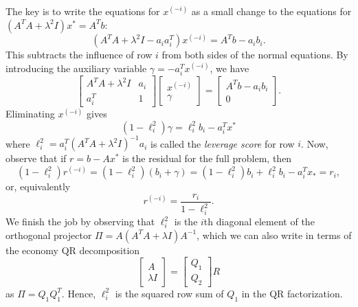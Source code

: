 \documentclass[12pt, leqno]{article} %
\begin{document}
The key is to write the equations for $x^{(-i)}$ as a small change to
the equations for $(A^T A + \lambda^2 I) x^* = A^T b$:
\[
  (A^T A + \lambda^2 I - a_i a_i^T) x^{(-i)} = A^T b - a_i b_i.
\]
This subtracts the influence of row $i$ from both sides of the normal
equations.  By introducing the auxiliary variable $\gamma = -a_i^T x^{(-i)}$,
we have
\[
  \begin{bmatrix}
    A^TA + \lambda^2 I & a_i \\
    a_i^T & 1
  \end{bmatrix}
  \begin{bmatrix} x^{(-i)} \\ \gamma \end{bmatrix} =
  \begin{bmatrix} A^T b - a_i b_i \\ 0 \end{bmatrix}.
\]
Eliminating $x^{(-i)}$ gives
\[
  (1-\ell_i^2) \gamma = \ell_i^2 b_i - a_i^T x^*
\]
where $\ell_i^2 = a_i^T (A^T A + \lambda^2 I)^{-1} a_i$ is called the
{\em leverage score} for row $i$.  Now, observe that
if $r = b-Ax^*$ is the residual for the full problem, then
\[
(1-\ell_i^2) r^{(-i)}
  = (1-\ell_i^2) (b_i + \gamma)
  = (1-\ell_i^2) b_i + \ell_i^2 b_i - a_i^T x_*
  = r_i,
\]
or, equivalently
\[
  r^{(-i)} = \frac{r_i}{1-\ell_i^2}.
\]
We finish the job by observing that $\ell_i^2$ is the $i$th diagonal
element of the orthogonal projector $\Pi = A(A^TA + \lambda I)A^{-1}$, which we
can also write in terms of the economy QR decomposition
\[
  \begin{bmatrix} A \\ \lambda I \end{bmatrix} =
  \begin{bmatrix} Q_1 \\ Q_2 \end{bmatrix} R
\]
as $\Pi = Q_1 Q_1^T$.  Hence, $\ell_i^2$ is the squared row sum of $Q_1$ in
the QR factorization.
\end{document}
